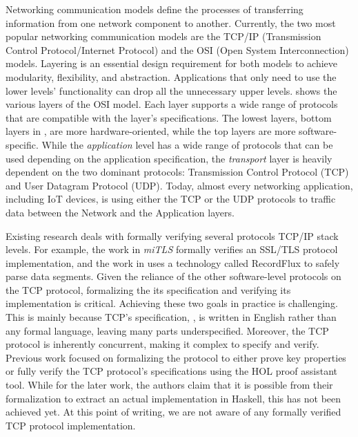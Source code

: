 \documentclass[conference]{IEEEtran}
\begin{document}
Networking communication models define the processes of transferring information from one network component to another. Currently, the two most popular networking communication models are the TCP/IP (Transmission Control Protocol/Internet Protocol) \cite{TCP_IP:ietf_tutorial} and the OSI (Open System Interconnection) \cite{ISO:35.100} models. Layering is an essential design requirement for both models to achieve modularity, flexibility, and abstraction. Applications that only need to use the lower levels' functionality can drop all the unnecessary upper levels.  shows the various layers of the OSI model. Each layer supports a wide range of protocols that are compatible with the layer's specifications. The lowest layers, bottom layers in , are more hardware-oriented, while the top layers are more software-specific. While the \emph{application} level has a wide range of protocols that can be used depending on the application specification, the \emph{transport} layer is heavily dependent on the two dominant protocols: Transmission Control Protocol (TCP) and User Datagram Protocol (UDP). Today, almost every networking application, including IoT devices, is using either the TCP or the UDP protocols to traffic data between the Network and the Application layers. %



Existing research deals with formally verifying several protocols TCP/IP stack levels. For example, the work in \emph{miTLS} \cite{bhargavan2013implementing} formally verifies an SSL/TLS protocol implementation, and the work in \cite{Reiher_2020} uses a technology called RecordFlux to safely parse data segments. Given the reliance of the other software-level protocols on the TCP protocol, formalizing the its specification and verifying its implementation is critical. Achieving these two goals in practice is challenging. This is mainly because TCP's specification, \cite{rfc793}, is written in English rather than any formal language, leaving many parts underspecified. Moreover, the TCP protocol is inherently concurrent, making it complex to specify and verify. Previous work focused on formalizing the protocol to either prove key properties \cite{smith1996formal} or fully verify the TCP protocol's specifications \cite{ridge2008rigorous} using the HOL proof assistant tool. While for the later work, the authors claim that it is possible from their formalization to extract an actual implementation in Haskell, this has not been achieved yet. At this point of writing, we are not aware of any formally verified TCP protocol implementation.
\end{document}
